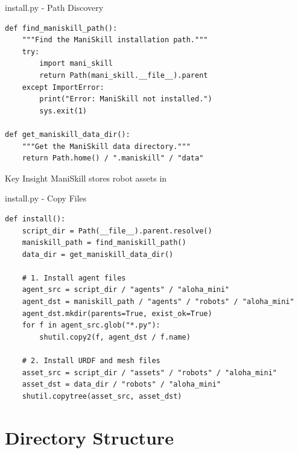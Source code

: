 \documentclass[aspectratio=169]{beamer}
\begin{document}
\begin{frame}[fragile]{install.py - Path Discovery}
\begin{lstlisting}
def find_maniskill_path():
    """Find the ManiSkill installation path."""
    try:
        import mani_skill
        return Path(mani_skill.__file__).parent
    except ImportError:
        print("Error: ManiSkill not installed.")
        sys.exit(1)

def get_maniskill_data_dir():
    """Get the ManiSkill data directory."""
    return Path.home() / ".maniskill" / "data"
\end{lstlisting}

\begin{block}{Key Insight}
ManiSkill stores robot assets in 
\end{block}
\end{frame}

\begin{frame}[fragile]{install.py - Copy Files}
\begin{lstlisting}[basicstyle=\ttfamily\scriptsize]
def install():
    script_dir = Path(__file__).parent.resolve()
    maniskill_path = find_maniskill_path()
    data_dir = get_maniskill_data_dir()

    # 1. Install agent files
    agent_src = script_dir / "agents" / "aloha_mini"
    agent_dst = maniskill_path / "agents" / "robots" / "aloha_mini"
    agent_dst.mkdir(parents=True, exist_ok=True)
    for f in agent_src.glob("*.py"):
        shutil.copy2(f, agent_dst / f.name)

    # 2. Install URDF and mesh files
    asset_src = script_dir / "assets" / "robots" / "aloha_mini"
    asset_dst = data_dir / "robots" / "aloha_mini"
    shutil.copytree(asset_src, asset_dst)
\end{lstlisting}
\end{frame}

\section{Directory Structure}
\end{document}
